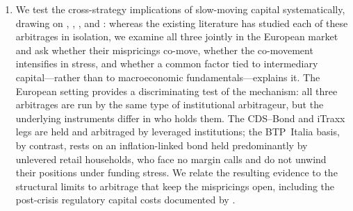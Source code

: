 \begin{enumerate}[label=\textbf{\arabic*.}, leftmargin=*, itemsep=4pt]
\item We test the cross-strategy implications of slow-moving capital
  systematically, drawing on \citet{duffie2010presidential},
  \citet{brunnermeier2009market}, \citet{mitchell2012arbitrage}, and
  \citet{fleckenstein2014tips}: whereas the existing literature has
  studied each of these arbitrages in isolation, we examine all three
  jointly in the European market and ask whether their mispricings
  co-move, whether the co-movement intensifies in stress, and whether
  a common factor tied to intermediary capital---rather than to
  macroeconomic fundamentals---explains it. The European setting
  provides a discriminating test of the mechanism: all three
  arbitrages are run by the same type of institutional arbitrageur,
  but the underlying instruments differ in who holds them. The
  CDS--Bond and iTraxx legs are held and arbitraged by leveraged
  institutions; the BTP~Italia basis, by contrast, rests on an
  inflation-linked bond held predominantly by unlevered retail
  households, who face no margin calls and do not unwind their
  positions under funding stress. We relate the resulting evidence to
  the structural limits to arbitrage that keep the mispricings open,
  including the post-crisis regulatory capital costs documented by
  \citet{boyarchenko2016trends}.

\end{enumerate}

